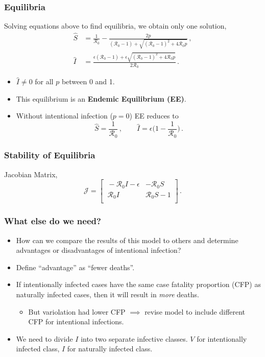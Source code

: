 \documentclass[12pt]{beamer}
\newcommand{\R}{\mathcal{R}}
\begin{document}
\begin{frame}
\frametitle{Equilibria}
Solving equations above to find equilibria, we obtain only one solution,
\begin{subequations}
\begin{align}
\hat{S} &=\frac{1}{\R_0}-\frac{2p}{(\R_0 -1)+ \sqrt{(\R_0-1)^2+4\R_0 p}}\,, \label{Shat1}\\
\hat{I} &= \frac{\epsilon(\R_0 -1)+ \epsilon \sqrt{(\R_0-1)^2+4\R_0
    p}}{2\R_0}\,.\label{Ihat1}
\end{align}
\end{subequations}
\begin{itemize}
\pause\item $\hat{I}\neq 0$ for all $p$ between 0 and 1. 
\pause\item This equilibrium is an {\bfseries Endemic Equilibrium (EE)}.
\pause\item Without intentional infection ($p=0$) EE reduces to
\begin{equation}
\hat{S} = \frac{1}{\R_0} \,,\qquad 
\hat{I} = \epsilon\Big(1-\frac{1}{\R_0}\Big) \,.
\end{equation}
\end{itemize}
\end{frame}
\begin{frame}
\frametitle{Stability of Equilibria}

Jacobian Matrix,
\begin{equation}
\mathcal{J} =
\begin{bmatrix}
    \ -\R_0 I-\epsilon       & -\R_0 S \\
    \ \R_0 I       & \R_0 S-1 \\
\end{bmatrix} \,.
\end{equation}
\end{frame}
\begin{frame}
\frametitle{What else do we need?}
\pause
\begin{itemize}\itemsep10pt
\item How can we compare the results of this model to others and
  determine advantages or disadvantages of intentional infection?
\pause
\item Define ``advantage'' as ``fewer deaths''.
\pause
\item If intentionally infected cases have the same case fatality proportion (CFP) as naturally infected cases, then it will result in \emph{more} deaths.
\begin{itemize}
\item But variolation had lower CFP
\pause $\implies$ revise model to include different CFP for
intentional infections.
\end{itemize}
\pause
\item We need to divide $I$ into two separate infective classes. $V$ for intentionally infected class, $I$ for naturally infected class.
\end{itemize}
\end{frame}
\end{document}

